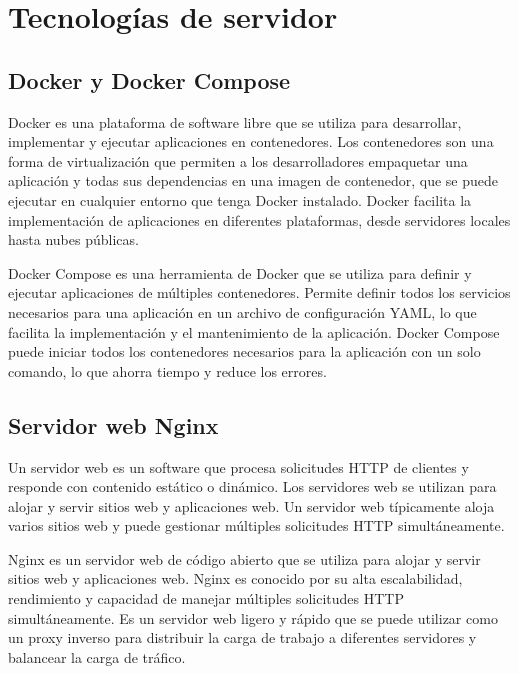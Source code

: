 
\section{Tecnologías de servidor}
\label{sec:servidor}

\subsection{Docker y Docker Compose}
\label{subsec:docker}

Docker es una plataforma de software libre que se utiliza para desarrollar, implementar y ejecutar aplicaciones en contenedores. Los contenedores son una forma de virtualización que permiten a los desarrolladores empaquetar una aplicación y todas sus dependencias en una imagen de contenedor, que se puede ejecutar en cualquier entorno que tenga Docker instalado. Docker facilita la implementación de aplicaciones en diferentes plataformas, desde servidores locales hasta nubes públicas.

Docker Compose es una herramienta de Docker que se utiliza para definir y ejecutar aplicaciones de múltiples contenedores. Permite definir todos los servicios necesarios para una aplicación en un archivo de configuración YAML, lo que facilita la implementación y el mantenimiento de la aplicación. Docker Compose puede iniciar todos los contenedores necesarios para la aplicación con un solo comando, lo que ahorra tiempo y reduce los errores.

\subsection{Servidor web Nginx}
\label{subsec:servidorweb}

Un servidor web es un software que procesa solicitudes HTTP de clientes y responde con contenido estático o dinámico. Los servidores web se utilizan para alojar y servir sitios web y aplicaciones web. Un servidor web típicamente aloja varios sitios web y puede gestionar múltiples solicitudes HTTP simultáneamente.

Nginx es un servidor web de código abierto que se utiliza para alojar y servir sitios web y aplicaciones web. Nginx es conocido por su alta escalabilidad, rendimiento y capacidad de manejar múltiples solicitudes HTTP simultáneamente. Es un servidor web ligero y rápido que se puede utilizar como un proxy inverso para distribuir la carga de trabajo a diferentes servidores y balancear la carga de tráfico.

